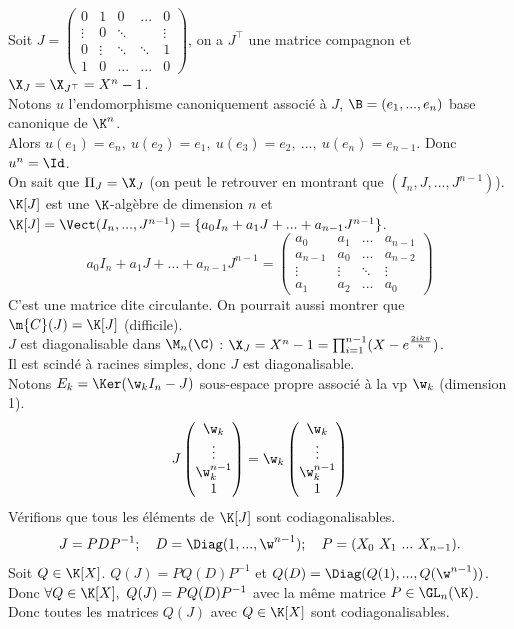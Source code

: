 \documentclass[11pt]{article}
\begin{document}
\begin{ex}{}{}
    Soit $J=\begin{pmatrix}0&1&0&...&0\\\vdots&0&\ddots&&\vdots\\0&\vdots&\ddots&\ddots&1\\1&0&...&...&0\end{pmatrix}$, on a $J^\top$ une matrice compagnon et $\X_J=\X_{J^\top}=X^n-1$.\\
    Notons $u$ l'endomorphisme canoniquement associé à $J$, $\B=(e_1,...,e_n)$ base canonique de $\K^n$.\\
    Alors $u(e_1)=e_n, ~ u(e_2)=e_1, ~ u(e_3)=e_2, ~ ..., ~ u(e_n)=e_{n-1}$. Donc $u^n=\Id$.\\
    On sait que $\Pi_J = \X_J$ (on peut le retrouver en montrant que $(I_n,J,...,J^{n-1})$).\\
    $\K[J]$ est une $\K$-algèbre de dimension $n$ et $\K[J]=\Vect(I_n,...,J^{n-1})=\{a_0I_n + a_1J + ... + a_{n-1}J^{n-1}\}$.
    \begin{equation*}
        a_0I_n + a_1J + ... + a_{n-1}J^{n-1} = \begin{pmatrix} a_0 & a_1 & ... & a_{n-1} \\ a_{n-1} & a_0 & ... & a_{n-2} \\ \vdots & \vdots & \ddots & \vdots \\ a_1 & a_2 & ... & a_0\end{pmatrix}
    \end{equation*}
    C'est une matrice dite circulante. On pourrait aussi montrer que $\m{C}(J)=\K[J]$ (difficile).\\
    $J$ est diagonalisable dans $\M_n(\C)$ : $\X_J=X^n-1=\prod_{i=1}^{n-1}(X-e^{\frac{2ik\pi}{n}})$.\\
    Il est scindé à racines simples, donc $J$ est diagonalisable.\\
    Notons $E_k=\Ker(\w_k I_n - J)$ sous-espace propre associé à la vp $\w_k$ (dimension 1). 
    \begin{equation*}
        J\begin{pmatrix}\w_k\\\vdots\\\w_k^{n-1}\\1\end{pmatrix} = \w_k\begin{pmatrix}\w_k\\\vdots\\\w_k^{n-1}\\1\end{pmatrix}
    \end{equation*}
    Vérifions que tous les éléments de $\K[J]$ sont codiagonalisables.
    \begin{equation*}
        J=PDP^{-1}; \quad D=\Diag(1,...,\w^{n-1}); \quad P=(X_0~X_1~...~X_{n-1}).
    \end{equation*}
    Soit $Q\in\K[X]$. $Q(J)=PQ(D)P^{-1}$ et $Q(D)=\Diag(Q(1),...,Q(\w^{n-1}))$.\\
    Donc $\forall Q \in \K[X], ~ Q(J)=PQ(D)P^{-1}$ avec la même matrice $P\in\GL_n(\K)$.\\
    Donc toutes les matrices $Q(J)$ avec $Q\in\K[X]$ sont codiagonalisables.
\end{ex}
\end{document}
